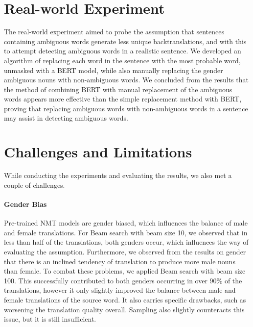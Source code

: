 
 
\section{Real-world Experiment}
\label{sec:Discussion:Real}

The real-world experiment aimed to probe the assumption that sentences containing ambiguous words generate less unique backtranslations, and with this to attempt detecting ambiguous words in a realistic sentence. We developed an algorithm of replacing each word in the sentence with the most probable word, unmasked with a BERT model, while also manually replacing the gender ambiguous nouns with non-ambiguous words. We concluded from the results that the method of combining BERT with manual replacement of the ambiguous words appears more effective than the simple replacement method with BERT, proving that replacing ambiguous words with non-ambiguous words in a sentence may assist in detecting ambiguous words.


\section{Challenges and Limitations}
\label{sec:Discussion:Challenges}

While conducting the experiments and evaluating the results, we also met a couple of challenges.

\paragraph{Gender Bias}
Pre-trained NMT models are gender biased, which influences the balance of male and female translations. For Beam search with beam size 10, we observed that in less than half of the translations, both genders occur, which influences the way of evaluating the assumption. Furthermore, we observed from the results on gender that there is an inclined tendency of translation to produce more male nouns than female. To combat these problems, we applied Beam search with beam size 100. This successfully contributed to both genders occurring in over 90\% of the translations, however it only slightly improved the balance between male and female translations of the source word. It also carries specific drawbacks, such as worsening the translation quality overall. Sampling also slightly counteracts this issue, but it is still insufficient.

